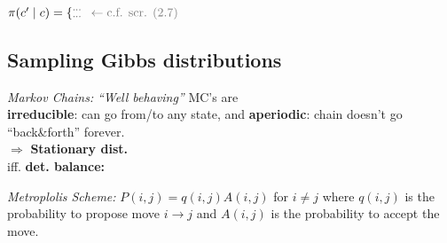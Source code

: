 $\pi(c'\mid c) = \{ \substack{\cdots\\\cdots} \enskip\color{gray} \leftarrow \text{c.f. scr. (2.7)}$

\iffalse
    \subsection{Sampling Gibbs distributions}
    
    \emph{Markov Chains:}
    \textit{``Well behaving''} MC's are\\
    \textbf{irreducible}: can go from/to any state, and
    \textbf{aperiodic}: chain doesn't go ``back\&forth'' forever.%
    \\$\Rightarrow$
    \textbf{Stationary dist.} \\ %
    iff. \textbf{det. balance:}  %
    
    \emph{Metroplolis Scheme:}
    $P(i,j) = q(i,j) A(i,j)$ for $i\neq j$ where $q(i,j)$ is the probability to propose move $i\to j$ and $A(i,j)$ is the probability to accept the move.
    
